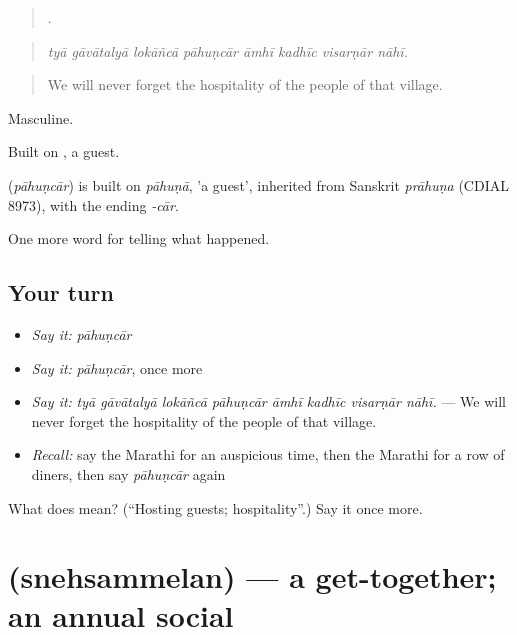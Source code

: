 \begin{quote}
       .
\end{quote}

\begin{quote}
\emph{tyā gāvātalyā lokāñcā pāhuṇcār āmhī kadhīc visarṇār nāhī.}
\end{quote}

\begin{quote}
We will never forget the hospitality of the people of that village.
\end{quote}

Masculine.

Built on , a guest.

\begin{cousinweb}
\textbf{} (\emph{pāhuṇcār}) is built on \emph{pāhuṇā}, 'a guest', inherited from Sanskrit \emph{prāhuṇa} (CDIAL 8973), with the ending \emph{-cār}.
\end{cousinweb}

\begin{grammarlens}[title={What you've built}]
One more word for telling what happened.
\end{grammarlens}

\subsection*{Your turn}
\begin{itemize}
\raggedright
  \item \emph{Say it:} \emph{pāhuṇcār}
  \item \emph{Say it:} \emph{pāhuṇcār}, once more
  \item \emph{Say it:} \emph{tyā gāvātalyā lokāñcā pāhuṇcār āmhī kadhīc visarṇār nāhī.} — We will never forget the hospitality of the people of that village.
  \item \emph{Recall:} say the Marathi for an auspicious time, then the Marathi for a row of diners, then say \emph{pāhuṇcār} again
\end{itemize}

\begin{tcolorbox}[breakable,colback=teal!4,colframe=teal!35!black,title={Before you move on}]
What does  mean? (\textquotedblleft{}Hosting guests; hospitality\textquotedblright{}.) Say it once more.
\end{tcolorbox}
\section[\texorpdfstring{\mr{स्नेहसंमेलन} (snehsammelan)}{स्नेहसंमेलन (snehsammelan)}]{ (snehsammelan) — a get-together; an annual social}


